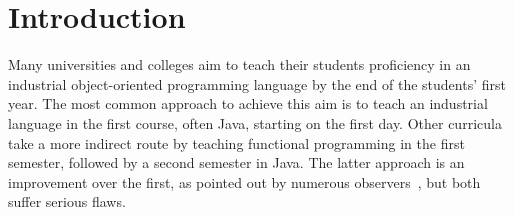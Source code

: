 \documentclass[submission,copyright]{eptcs}
\title{\thetitle}
\author{Sam Tobin-Hochstadt \quad\qquad David Van Horn
\institute{Northeastern University\\
Boston, Massachusetts, USA}
\email{\{samth,dvanhorn\}@ccs.neu.edu}
}
\begin{document}
\maketitle

\begin{abstract}
We propose a bridge between functional and object-oriented programming
in the first-year curriculum.  Traditionally, curricula that begin
with functional programming transition to a professional, usually
object-oriented, language in the second course.  This transition poses
obstacles for students, and often results in confusing the details of
development environments, syntax, and libraries with the fundamentals
of OO programming that the course should focus on.  Instead, we
propose to begin the second course with a sequence of custom teaching
languages which minimize the transition from the first course, and
allow students to focus on core ideas.  After working through the
sequence of pedagogical languages, we then transition to Java, at
which point students have a strong command of the basic principles.
We have 3 years of experience with this course, with notable success.
\end{abstract}

\section{Introduction}
\label{sec:intro}

Many universities and colleges aim to teach their students proficiency
in an industrial object-oriented programming language by the end of
the students' first year.  The most common approach to achieve this
aim is to teach an industrial language in the first course, often
Java, starting on the first day.  Other curricula take a more indirect
route by teaching functional programming in the first semester,
followed by a second semester in Java.  The latter approach is an
improvement over the first, as pointed out by numerous
observers~\cite{dvanhorn:Felleisen2004Structure, local:spolsky,
  dvanhorn:Chakravarty2004Risks, dvanhorn:Ragde2008Chilling}, but
both suffer serious flaws.
\end{document}
